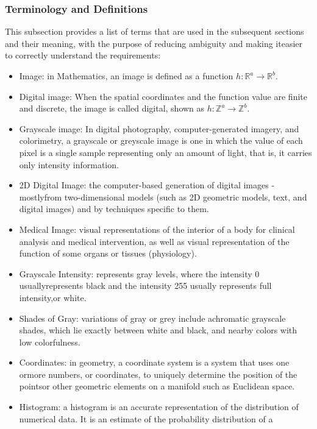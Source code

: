 \documentclass[12pt]{article}
\begin{document}
\subsubsection{Terminology and  Definitions}

This subsection provides a list of terms that are used in the subsequent
sections and their meaning, with the purpose of reducing ambiguity and making
iteasier to correctly understand the requirements:

\begin{itemize}

\item Image: in Mathematics, an image is defined as a function
  $h : \mathbb{R}^{a} \rightarrow \mathbb{R}^{b}$.
\item Digital image: When the spatial coordinates and the function value are
  finite and discrete, the image is called digital, shown as
  $h : \mathbb{Z}^{a} \rightarrow \mathbb{Z}^{b}$.
\item Grayscale image: In digital photography, computer-generated imagery, and
  colorimetry, a grayscale or greyscale image is one in which the value of each
  pixel is a single sample representing only an amount of light, that is, it
  carries only intensity information.
\item 2D Digital Image: the computer-based generation of digital images -
mostlyfrom two-dimensional models (such as 2D geometric models, text, and
digital
  images) and by techniques specific to them.
\item Medical Image: visual representations of the interior of a body for
  clinical analysis and medical intervention, as well as visual representation
  of the function of some organs or tissues (physiology).
\item Grayscale Intensity: represents gray levels, where the intensity 0
usuallyrepresents black and the intensity 255 usually represents full
intensity,or
  white.
\item Shades of Gray: variations of gray or grey include achromatic grayscale
  shades, which lie exactly between white and black, and nearby colors with low
  colorfulness.
\item Coordinates: in geometry, a coordinate system is a system that uses one
ormore numbers, or coordinates, to uniquely determine the position of the
pointsor other geometric elements on a manifold such as Euclidean space.
\item Histogram: a histogram is an accurate representation of the distribution
  of numerical data. It is an estimate of the probability distribution of a

\end{itemize}
\end{document}
